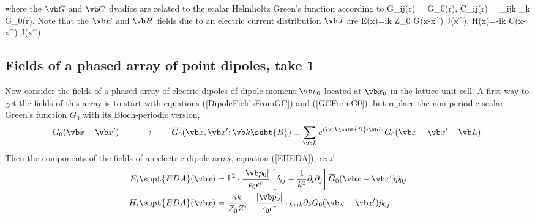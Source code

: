 \documentclass[letterpaper]{article}
\begin{document}
where the $\vb G$ and $\vb C$ dyadics are related to the
scalar Helmholtz Green's function according to
{
  G_{ij}(\vb r)
   =  G_0(\vb r),
\qquad
   C_{ij}(\vb r)
   = \varepsilon_{ijk} \partial_k G_0(\vb r).
}
Note that the $\vb E$ and $\vb H$ fields due to an electric 
current distribution $\vb J$ are
{ \vb E(\vb x)=ik Z_0 \int \vb G(\vb x-\vb x^\prime) \cdot \vb J(\vb x^\prime),
  \qquad
  \vb H(\vb x)=-ik \int \vb C(\vb x-\vb x^\prime) \cdot \vb J(\vb x^\prime).
}
   

\subsection*{Fields of a phased array of point dipoles, take 1}

Now consider the fields of a phased array of electric dipoles
of dipole moment $\vb p_0$ located at $\vb x_0$ in the lattice 
unit cell.
A first way to get the fields of this array is 
to start with equations (\ref{DipoleFieldsFromGC}) and
(\ref{GCFromG0}), but replace the non-periodic scalar
Green's function $G_0$ with its Bloch-periodic version,
$$ G_0(\vb x-\vb x^\prime) \qquad \longrightarrow \qquad 
   \overline{G_0}(\vb x, \vb x^\prime; \vb k\subt{B}) \equiv
   \sum_{\vb L} e^{i \vb k\subt{B} \cdot \vb L} \, G_0(\vb x- \vb x^\prime-\vb L).
$$
Then the components of the fields of an electric dipole array, 
equation (\ref{EHEDA}), read
\begin{align*}
 E_i\supt{EDA}(\vb x)
 &=k^2 \cdot \frac{|\vb p_0|}{\epsilon_0 \epsilon^r } 
    \left[ \delta_{ij} + \frac{1}{k^2}\partial_i \partial_j
    \right] \overline{G}_{0}(\vb x-\vb x^\prime)\hat{p}_{0j}
\\
 H_i\supt{EDA}(\vb x)
 &=\frac{ik}{Z_0 Z^r}
    \cdot \frac{|\vb p_0|}{\epsilon_0 \epsilon^r } \cdot
    \epsilon_{ijk} \partial_k \overline{G}_{0}(\vb x-\vb x^\prime)
    \hat{p}_{0j}.
\end{align*}
\end{document}
